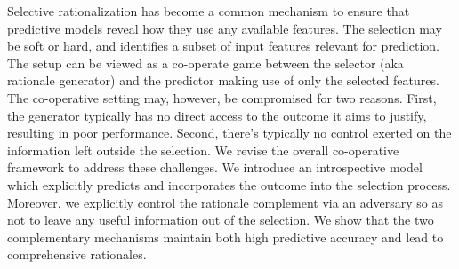 Selective rationalization has become a common mechanism to ensure that predictive models reveal how they use any available features. The selection may be soft or hard, and identifies a subset of input features relevant for prediction. The setup can be viewed as a co-operate game between the selector (aka rationale generator) and the predictor making use of only the selected features. The co-operative setting may, however, be compromised for two reasons. First, the generator typically has no direct access to the outcome it aims to justify, resulting in poor performance. Second, there's typically no control exerted on the information left outside the selection. We revise the overall co-operative framework to address these challenges. We introduce an introspective model which explicitly predicts and incorporates the outcome into the selection process. Moreover, we explicitly control the rationale complement via an adversary so as not to leave any useful information out of the selection. We show that the two complementary mechanisms maintain both high predictive accuracy and lead to comprehensive rationales.